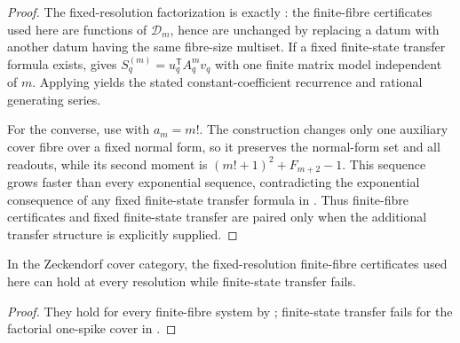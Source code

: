 \begin{proof}
The fixed-resolution factorization is exactly
: the finite-fibre certificates used
here are functions of \(\mathcal D_m\), hence are unchanged by replacing a datum
with another datum having the same fibre-size multiset.  If a fixed finite-state transfer formula
exists,  gives
\(S_q^{(m)}=u_q^{\mathsf T}A_q^m v_q\) with one finite matrix model independent of
\(m\).  Applying  yields the stated
constant-coefficient recurrence and rational generating series.

For the converse, use  with
\(a_m=m!\).  The construction changes only one auxiliary cover fibre over a fixed
normal form, so it preserves the normal-form set and all readouts, while its
second moment is \((m!+1)^2+F_{m+2}-1\).  This sequence grows faster than every
exponential sequence, contradicting the exponential consequence of any fixed
finite-state transfer formula in .
Thus finite-fibre certificates and fixed finite-state transfer are paired only
when the additional transfer structure is explicitly supplied.
\end{proof}

\begin{corollary}
\label{cor:hankel-psd-independent}
In the Zeckendorf cover category, the fixed-resolution finite-fibre certificates
used here can hold at every resolution while finite-state transfer fails.
\end{corollary}

\begin{proof}
They hold for every finite-fibre system by
; finite-state transfer fails for the
factorial one-spike cover in .
\end{proof}


